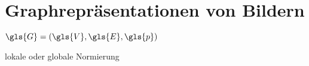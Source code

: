 \chapter{Graphrepräsentationen von Bildern}
\label{graphrepraesentationen_von_bildern}

$\gls{G} = \left(\gls{V}, \gls{E}, \gls{p}\right)$

lokale oder globale Normierung




